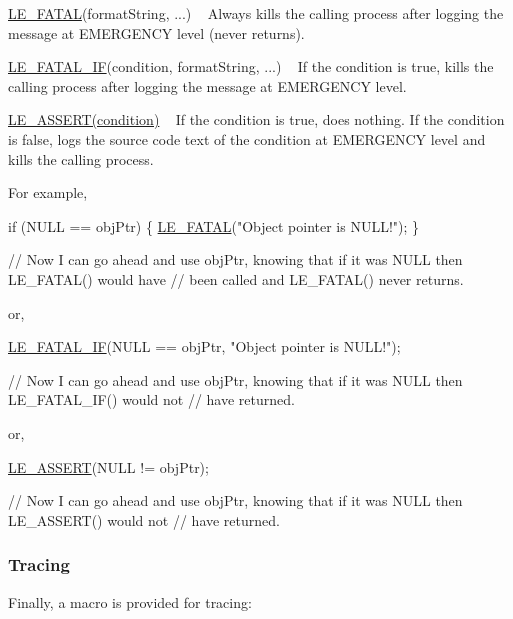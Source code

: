 \begin{DoxyItemize}
\item \hyperlink{le__log_8h_a54b4b07f5396e19a8d9fca74238f4795}{L\+E\+\_\+\+F\+A\+T\+A\+L}(format\+String, ...) ~\newline
 Always kills the calling process after logging the message at E\+M\+E\+R\+G\+E\+N\+C\+Y level (never returns).
\item \hyperlink{le__log_8h_a7a3e66a87026cc9e57bcb748840ab41b}{L\+E\+\_\+\+F\+A\+T\+A\+L\+\_\+\+I\+F}(condition, format\+String, ...) ~\newline
 If the condition is true, kills the calling process after logging the message at E\+M\+E\+R\+G\+E\+N\+C\+Y level.
\item \hyperlink{le__log_8h_ac0dbbef91dc0fed449d0092ff0557b39}{L\+E\+\_\+\+A\+S\+S\+E\+R\+T(condition)} ~\newline
 If the condition is true, does nothing. If the condition is false, logs the source code text of the condition at E\+M\+E\+R\+G\+E\+N\+C\+Y level and kills the calling process.
\end{DoxyItemize}

For example, 
\begin{DoxyCode}
\textcolor{keywordflow}{if} (NULL == objPtr)
\{
    \hyperlink{le__log_8h_a54b4b07f5396e19a8d9fca74238f4795}{LE\_FATAL}(\textcolor{stringliteral}{"Object pointer is NULL!"});
\}

\textcolor{comment}{// Now I can go ahead and use objPtr, knowing that if it was NULL then LE\_FATAL() would have}
\textcolor{comment}{// been called and LE\_FATAL() never returns.}
\end{DoxyCode}


or,


\begin{DoxyCode}
\hyperlink{le__log_8h_a7a3e66a87026cc9e57bcb748840ab41b}{LE\_FATAL\_IF}(NULL == objPtr, \textcolor{stringliteral}{"Object pointer is NULL!"});

\textcolor{comment}{// Now I can go ahead and use objPtr, knowing that if it was NULL then LE\_FATAL\_IF() would not}
\textcolor{comment}{// have returned.}
\end{DoxyCode}


or,


\begin{DoxyCode}
\hyperlink{le__log_8h_ac0dbbef91dc0fed449d0092ff0557b39}{LE\_ASSERT}(NULL != objPtr);

\textcolor{comment}{// Now I can go ahead and use objPtr, knowing that if it was NULL then LE\_ASSERT() would not}
\textcolor{comment}{// have returned.}
\end{DoxyCode}
\hypertarget{c_logging_c_log_tracing}{}\subsubsection{Tracing}\label{c_logging_c_log_tracing}
Finally, a macro is provided for tracing\+:


